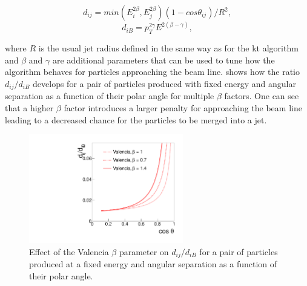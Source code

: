 \begin{equation}
d_{ij}=min(E_i^{2\beta},E_j^{2\beta})(1-cos\theta_{ij})/R^2,
\end{equation}
\begin{equation}
d_{iB}=p_T^{2\gamma}E^{2(\beta - \gamma)},
\end{equation}

where $R$ is the usual jet radius defined in the same way as for the kt algorithm and $\beta$ and $\gamma$ are additional parameters that can be used to tune how the algorithm behaves for particles approaching the beam line.  shows how the ratio $d_{ij}/d_{iB}$ develops for a pair of particles produced with fixed energy and angular separation as a function of their polar angle for multiple $\beta$ factors. One can see that a higher $\beta$ factor introduces a larger penalty for approaching the beam line leading to a decreased chance for the particles to be merged into a jet.

\begin{figure}
  \centering
  \includegraphics[width=0.6\textwidth]{TopAnalysis/figures/distance_ratio_vlc.pdf}
  \caption[Effect of the Valencia $\beta$ parameter]{Effect of the Valencia $\beta$ parameter on $d_{ij}/d_{iB}$ for a pair of particles produced at a fixed energy and angular separation as a function of their polar angle\cite{Boronat:2014hva}.}
  \label{fig:valenciaPerformance}
\end{figure}


